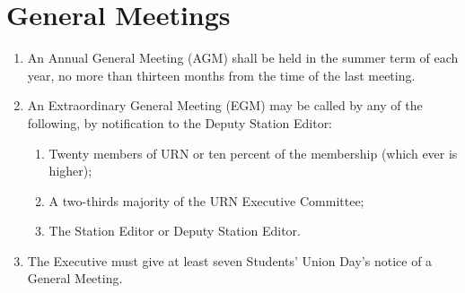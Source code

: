 \section{General Meetings}

\begin{enumerate}[label*=\thesection.\arabic*.]
    \item An Annual General Meeting (AGM) shall be held in the summer term of each year, no more than thirteen months from the time of the last meeting.
    \item \label{itm:egm-conds} An Extraordinary General Meeting (EGM) may be called by any of the following, by notification to the Deputy Station Editor:
          \begin{enumerate}[label*=\arabic*.]
              \item Twenty members of URN or ten percent of the membership (which ever is higher);
              \item A two-thirds majority of the URN Executive Committee;
              \item The Station Editor or Deputy Station Editor.
          \end{enumerate}
    \item The Executive must give at least seven Students' Union Day's notice of a General Meeting.
\end{enumerate}
